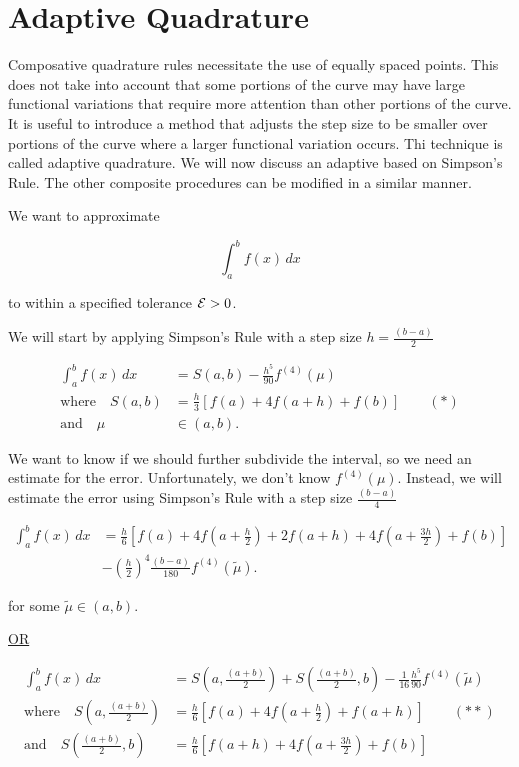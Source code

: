 \section{Adaptive Quadrature}
\label{sec:adaptive_quadrature}

Composative quadrature rules necessitate the use of equally spaced points. This
does not take into account that some portions of the curve may have large
functional variations that require more attention than other portions of the
curve. It is useful to introduce a method that adjusts the step size to be
smaller over portions of the curve where a larger functional variation occurs.
Thi technique is called adaptive quadrature. We will now discuss an adaptive
based on Simpson's Rule. The other composite procedures can be modified in a
similar manner.

We want to approximate 

\begin{equation*}
  \int_{a}^{b} f(x) \, dx
\end{equation*}

to within a specified tolerance $\mathcal{E} > 0$.

We will start by applying Simpson's Rule with a step size $h=\frac{(b-a)}{2}$

\begin{align*}
  \int_{a}^{b} f(x) \, dx &= S(a,b) - \frac{h^5}{90}f^{(4)} (\mu)\\
  \text{where} \quad  S(a,b) &= \frac{h}{3}\left[f(a) + 4f(a+h) +f(b)\right]
  \qquad (*)\\
    \text{and} \quad  \mu &\in (a,b)
.\end{align*}

We want to know if we should further subdivide the interval, so we need an
estimate for the error. Unfortunately, we don't know $f^{(4)}(\mu)$. Instead, we
will estimate the error using Simpson's Rule with a step size $\frac{(b-a)}{4}$

\begin{align*}
  \int_{a}^{b} f(x) \, dx &= \frac{h}{6} \left[
    f(a) + 4f(a+\frac{h}{2}) + 2f(a+h) +4f(a+ \frac{3h}{2}) + f(b)
  \right] \\
                          &- (\frac{h}{2})^4 \frac{(b-a)}{180} f^{(4)} (\tilde{\mu})
.\end{align*}

for some $\tilde{\mu} \in (a,b)$.

\uline{OR}

\begin{align*}
  \int_{a}^{b} f(x) \, dx &= S(a, \frac{(a+b)}{2}) + S(\frac{(a+b)}{2}, b) -
  \frac{1}{16} \frac{h^5}{90} f^{(4)} (\tilde\mu) \\
  \text{where} \quad  S(a, \frac{(a+b)}{2}) &= \frac{h}{6} \left[
    f(a) + 4f(a+\frac{h}{2}) + f(a+h)
  \right] \qquad (**)\\
    \text{and} \quad  S(\frac{(a+b)}{2},b) &= \frac{h}{6} \left[
      f(a+h) + 4f(a+\frac{3h}{2}) + f(b)
      \right]
\end{align*}

